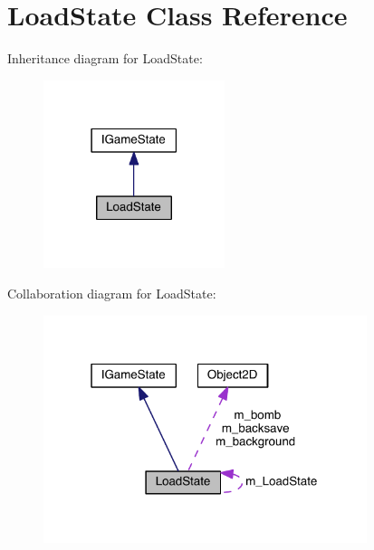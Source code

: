 \hypertarget{class_load_state}{}\section{Load\+State Class Reference}
\label{class_load_state}


Inheritance diagram for Load\+State\+:\nopagebreak
\begin{figure}[H]
\begin{center}
\leavevmode
\includegraphics[width=150pt]{class_load_state__inherit__graph}
\end{center}
\end{figure}


Collaboration diagram for Load\+State\+:\nopagebreak
\begin{figure}[H]
\begin{center}
\leavevmode
\includegraphics[width=268pt]{class_load_state__coll__graph}
\end{center}
\end{figure}
